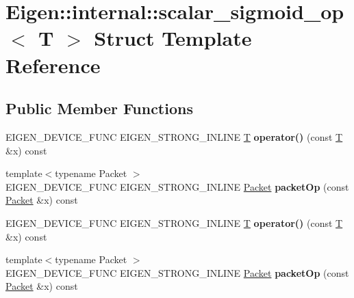 \hypertarget{struct_eigen_1_1internal_1_1scalar__sigmoid__op}{}\section{Eigen\+:\+:internal\+:\+:scalar\+\_\+sigmoid\+\_\+op$<$ T $>$ Struct Template Reference}
\label{struct_eigen_1_1internal_1_1scalar__sigmoid__op}
\subsection*{Public Member Functions}
\begin{DoxyCompactItemize}
\item 
\mbox{\label{struct_eigen_1_1internal_1_1scalar__sigmoid__op_a267a7bcc3e127927294909a37b1664ba}} 
E\+I\+G\+E\+N\+\_\+\+D\+E\+V\+I\+C\+E\+\_\+\+F\+U\+NC E\+I\+G\+E\+N\+\_\+\+S\+T\+R\+O\+N\+G\+\_\+\+I\+N\+L\+I\+NE \hyperlink{group___sparse_core___module}{T} {\bfseries operator()} (const \hyperlink{group___sparse_core___module}{T} \&x) const
\item 
\mbox{\label{struct_eigen_1_1internal_1_1scalar__sigmoid__op_a72f5fbe3c40d1958e6d32f62cb1debe4}} 
{\footnotesize template$<$typename Packet $>$ }\\E\+I\+G\+E\+N\+\_\+\+D\+E\+V\+I\+C\+E\+\_\+\+F\+U\+NC E\+I\+G\+E\+N\+\_\+\+S\+T\+R\+O\+N\+G\+\_\+\+I\+N\+L\+I\+NE \hyperlink{union_eigen_1_1internal_1_1_packet}{Packet} {\bfseries packet\+Op} (const \hyperlink{union_eigen_1_1internal_1_1_packet}{Packet} \&x) const
\item 
\mbox{\label{struct_eigen_1_1internal_1_1scalar__sigmoid__op_a267a7bcc3e127927294909a37b1664ba}} 
E\+I\+G\+E\+N\+\_\+\+D\+E\+V\+I\+C\+E\+\_\+\+F\+U\+NC E\+I\+G\+E\+N\+\_\+\+S\+T\+R\+O\+N\+G\+\_\+\+I\+N\+L\+I\+NE \hyperlink{group___sparse_core___module}{T} {\bfseries operator()} (const \hyperlink{group___sparse_core___module}{T} \&x) const
\item 
\mbox{\label{struct_eigen_1_1internal_1_1scalar__sigmoid__op_a72f5fbe3c40d1958e6d32f62cb1debe4}} 
{\footnotesize template$<$typename Packet $>$ }\\E\+I\+G\+E\+N\+\_\+\+D\+E\+V\+I\+C\+E\+\_\+\+F\+U\+NC E\+I\+G\+E\+N\+\_\+\+S\+T\+R\+O\+N\+G\+\_\+\+I\+N\+L\+I\+NE \hyperlink{union_eigen_1_1internal_1_1_packet}{Packet} {\bfseries packet\+Op} (const \hyperlink{union_eigen_1_1internal_1_1_packet}{Packet} \&x) const
\end{DoxyCompactItemize}


